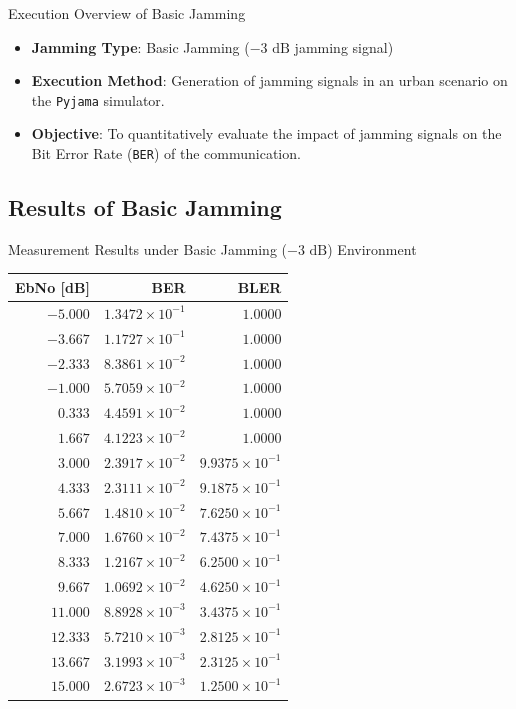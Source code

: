 \documentclass[11pt, aspectratio=169]{beamer}
\begin{document}
\begin{frame}{Execution Overview of Basic Jamming}
  \begin{itemize}
    \item \textbf{Jamming Type}: Basic Jamming ($-3\text{ dB}$ jamming signal)
    \item \textbf{Execution Method}: Generation of jamming signals in an urban scenario on the \texttt{Pyjama} simulator.
    \item \textbf{Objective}: To quantitatively evaluate the impact of jamming signals on the Bit Error Rate (\texttt{BER}) of the communication.
  \end{itemize}
\end{frame}

\subsection{Results of Basic Jamming}

\begin{frame}{Measurement Results under Basic Jamming ($-3\text{ dB}$) Environment}
  \begin{table}[htbp]
    \centering
    \scriptsize 
    \begin{tabular}{rrr}
      \toprule
      EbNo [dB] & BER & BLER \\
      \midrule
      $-5.000$ & $1.3472 \times 10^{-1}$ & $1.0000$ \\
      $-3.667$ & $1.1727 \times 10^{-1}$ & $1.0000$ \\
      $-2.333$ & $8.3861 \times 10^{-2}$ & $1.0000$ \\
      $-1.000$ & $5.7059 \times 10^{-2}$ & $1.0000$ \\
      $0.333$ & $4.4591 \times 10^{-2}$ & $1.0000$ \\
      $1.667$ & $4.1223 \times 10^{-2}$ & $1.0000$ \\
      $3.000$ & $2.3917 \times 10^{-2}$ & $9.9375 \times 10^{-1}$ \\
      $4.333$ & $2.3111 \times 10^{-2}$ & $9.1875 \times 10^{-1}$ \\
      $5.667$ & $1.4810 \times 10^{-2}$ & $7.6250 \times 10^{-1}$ \\
      $7.000$ & $1.6760 \times 10^{-2}$ & $7.4375 \times 10^{-1}$ \\
      $8.333$ & $1.2167 \times 10^{-2}$ & $6.2500 \times 10^{-1}$ \\
      $9.667$ & $1.0692 \times 10^{-2}$ & $4.6250 \times 10^{-1}$ \\
      $11.000$ & $8.8928 \times 10^{-3}$ & $3.4375 \times 10^{-1}$ \\
      $12.333$ & $5.7210 \times 10^{-3}$ & $2.8125 \times 10^{-1}$ \\
      $13.667$ & $3.1993 \times 10^{-3}$ & $2.3125 \times 10^{-1}$ \\
      $15.000$ & $2.6723 \times 10^{-3}$ & $1.2500 \times 10^{-1}$ \\
      \bottomrule
    \end{tabular}
  \end{table}
\end{frame}
\end{document}
